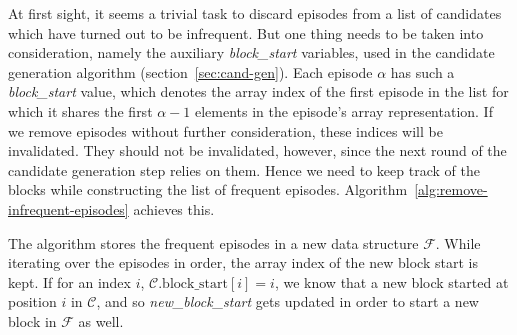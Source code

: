 At first sight, it seems a trivial task to discard episodes from a list of candidates which have turned out to be infrequent. But one thing needs to be taken into consideration, namely the auxiliary \emph{block\_start} variables, used in the candidate generation algorithm (section~\ref{sec:cand-gen}). Each episode $ \alpha $ has such a \emph{block\_start} value, which denotes the array index of the first episode in the list for which it shares the first $ \alpha - 1 $ elements in the episode's array representation. If we remove episodes without further consideration, these indices will be invalidated. They should not be invalidated, however, since the next round of the candidate generation step relies on them. Hence we need to keep track of the blocks while constructing the list of frequent episodes. Algorithm~\ref{alg:remove-infrequent-episodes} achieves this.

The algorithm stores the frequent episodes in a new data structure $ \mathcal{F} $. While iterating over the episodes in order, the array index of the new block start is kept. If for an index $ i $, $ \mathcal{C}. \text{block\_start}[i] = i $, we know that a new block started at position $ i $ in $ \mathcal{C} $, and so \emph{new\_block\_start} gets updated in order to start a new block in $ \mathcal{F} $ as well.
